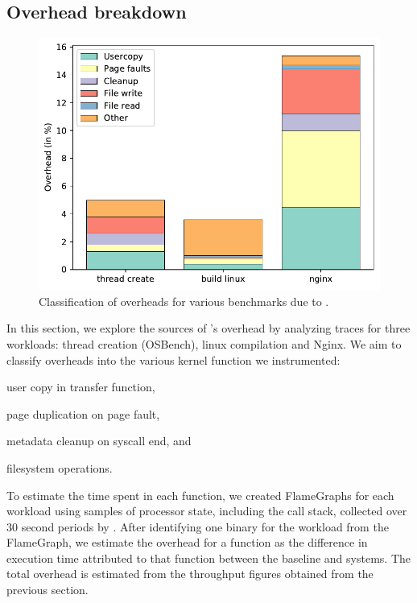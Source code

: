 \documentclass[letterpaper,twocolumn,10pt]{article}
\begin{document}
\subsection{Overhead breakdown}

\begin{figure}
  \includegraphics[width=\linewidth]{img/overhead.pdf}
  \caption{Classification of overheads for various benchmarks due to \tiktok.}
  \label{fig:overhead_class}
\end{figure}

In this section, we explore the sources of \tiktok's overhead by analyzing 
 traces for three workloads: thread creation (OSBench), linux 
compilation and Nginx. 
We aim to classify overheads into the various kernel function we instrumented:
\begin{inparaenum}
\item user copy in transfer function,
\item page duplication on page fault,
\item metadata cleanup on syscall end, and
\item filesystem operations.
\end{inparaenum}

To estimate the time spent in each function, we created FlameGraphs for 
each workload\cite{GreggFlameGraph} using samples of processor state, including
the call stack, collected over 30 second periods by .
After identifying one binary for the workload from the FlameGraph, we estimate 
the overhead for a function as the difference in execution time attributed to 
that function between the baseline and \tiktok systems.
The total overhead is estimated from the throughput figures obtained from the 
previous section.
\end{document}
